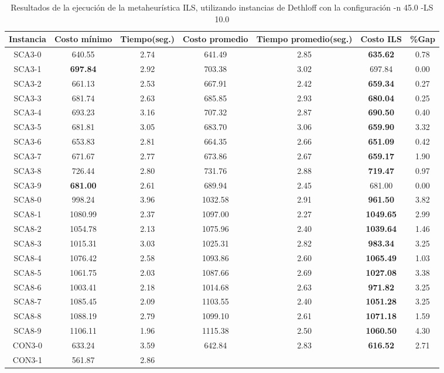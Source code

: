 \begin{table}[ht]
\caption{Resultados de la ejecución de la metaheurística ILS, utilizando instancias de Dethloff con la configuración -n 45.0 -LS 10.0}
\centering
\small
\begin{tabular}{c c c c c c c}
\hline\hline
Instancia & Costo mínimo & Tiempo(seg.) & Costo promedio & Tiempo promedio(seg.) & Costo ILS & \%Gap \\ [0.5ex]
\hline
SCA3-0 & 640.55 & 2.74 & 
641.49 & 2.85 & \bf{635.62} & 
0.78\\SCA3-1 & \bf{697.84} & 2.92 & 
703.38 & 3.02 & 697.84 & 0.00\\
SCA3-2 & 661.13 & 2.53 & 
667.91 & 2.42 & \bf{659.34} & 
0.27\\SCA3-3 & 681.74 & 2.63 & 
685.85 & 2.93 & \bf{680.04} & 
0.25\\SCA3-4 & 693.23 & 3.16 & 
707.32 & 2.87 & \bf{690.50} & 
0.40\\SCA3-5 & 681.81 & 3.05 & 
683.70 & 3.06 & \bf{659.90} & 
3.32\\SCA3-6 & 653.83 & 2.81 & 
664.35 & 2.66 & \bf{651.09} & 
0.42\\SCA3-7 & 671.67 & 2.77 & 
673.86 & 2.67 & \bf{659.17} & 
1.90\\SCA3-8 & 726.44 & 2.80 & 
731.76 & 2.88 & \bf{719.47} & 
0.97\\SCA3-9 & \bf{681.00} & 2.61 & 
689.94 & 2.45 & 681.00 & 0.00\\
SCA8-0 & 998.24 & 3.96 & 
1032.58 & 2.91 & \bf{961.50} & 
3.82\\SCA8-1 & 1080.99 & 2.37 & 
1097.00 & 2.27 & \bf{1049.65} & 
2.99\\SCA8-2 & 1054.78 & 2.13 & 
1075.96 & 2.40 & \bf{1039.64} & 
1.46\\SCA8-3 & 1015.31 & 3.03 & 
1025.31 & 2.82 & \bf{983.34} & 
3.25\\SCA8-4 & 1076.42 & 2.58 & 
1093.86 & 2.60 & \bf{1065.49} & 
1.03\\SCA8-5 & 1061.75 & 2.03 & 
1087.66 & 2.69 & \bf{1027.08} & 
3.38\\SCA8-6 & 1003.41 & 2.18 & 
1014.68 & 2.63 & \bf{971.82} & 
3.25\\SCA8-7 & 1085.45 & 2.09 & 
1103.55 & 2.40 & \bf{1051.28} & 
3.25\\SCA8-8 & 1088.19 & 2.79 & 
1099.10 & 2.61 & \bf{1071.18} & 
1.59\\SCA8-9 & 1106.11 & 1.96 & 
1115.38 & 2.50 & \bf{1060.50} & 
4.30\\CON3-0 & 633.24 & 3.59 & 
642.84 & 2.83 & \bf{616.52} & 
2.71\\CON3-1 & 561.87 & 2.86 & 

\end{tabular}
\end{table}
